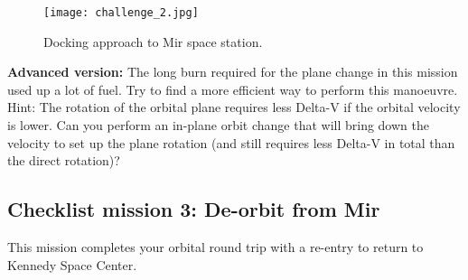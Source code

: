 \documentclass[Orbiter User Manual.tex]{subfiles}
\begin{document}
\begin{figure}[H]
	\centering
	\texttt{[image: challenge\_2.jpg]}
	\caption{Docking approach to Mir space station.}
\end{figure}

\noindent
\textbf{Advanced version:} The long burn required for the plane change in this mission used up a lot of fuel. Try to find a more efficient way to perform this manoeuvre. Hint: The rotation of the orbital plane requires less Delta-V if the orbital velocity is lower. Can you perform an in-plane orbit change that will bring down the velocity to set up the plane rotation (and still requires less Delta-V in total than the direct rotation)?


\subsection{Checklist mission 3: De-orbit from Mir}
This mission completes your orbital round trip with a re-entry to return to Kennedy Space Center.
\end{document}
